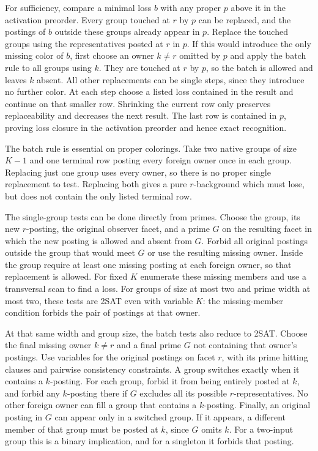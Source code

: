 For sufficiency, compare a minimal loss $b$ with any
proper $p$ above it in the activation preorder.
Every group touched at $r$ by $p$ can be replaced, and
the postings of $b$ outside these groups already
appear in $p$. Replace the touched groups using the
representatives posted at $r$ in $p$. If this would
introduce the only missing color of $b$, first choose
an owner $k\ne r$ omitted by $p$ and apply the batch
rule to all groups using $k$. They are touched at $r$
by $p$, so the batch is allowed and leaves $k$ absent.
All other replacements can be single steps, since
they introduce no further color. At each step choose
a listed loss contained in the result and continue on
that smaller row. Shrinking the current row only
preserves replaceability and decreases the next result.
The last row is contained in $p$, proving loss closure
in the activation preorder and hence exact recognition.

The batch rule is essential on proper colorings. Take
two native groups of size $K-1$ and one terminal row
posting every foreign owner once in each group.
Replacing just one group uses every owner, so there is
no proper single replacement to test. Replacing both
gives a pure $r$-background which must lose, but does
not contain the only listed terminal row.

The single-group tests can be done directly from primes.
Choose the group, its new $r$-posting, the original
observer facet, and a prime $G$ on the resulting
facet in which the new posting is allowed and absent
from $G$. Forbid all original postings outside the group
that would meet $G$ or use the resulting missing owner.
Inside the group require at least one missing posting
at each foreign owner, so that replacement is allowed.
For fixed $K$ enumerate these missing members and use
a transversal scan to find a loss. For groups of size
at most two and prime width at most two, these tests
are 2SAT even with variable $K$: the missing-member
condition forbids the pair of postings at that owner.

At that same width and group size, the batch tests
also reduce to 2SAT. Choose the final missing owner
$k\ne r$ and a final prime $G$ not containing that
owner's postings. Use variables for the original
postings on facet $r$, with its prime hitting clauses
and pairwise consistency constraints. A group switches
exactly when it contains a $k$-posting. For each group,
forbid it from being entirely posted at $k$, and
forbid any $k$-posting there if $G$ excludes all its
possible $r$-representatives. No other foreign owner
can fill a group that contains a $k$-posting. Finally,
an original posting in $G$ can appear only in a switched
group. If it appears, a different member of that group
must be posted at $k$, since $G$ omits $k$. For a
two-input group this is a binary implication, and for
a singleton it forbids that posting.

